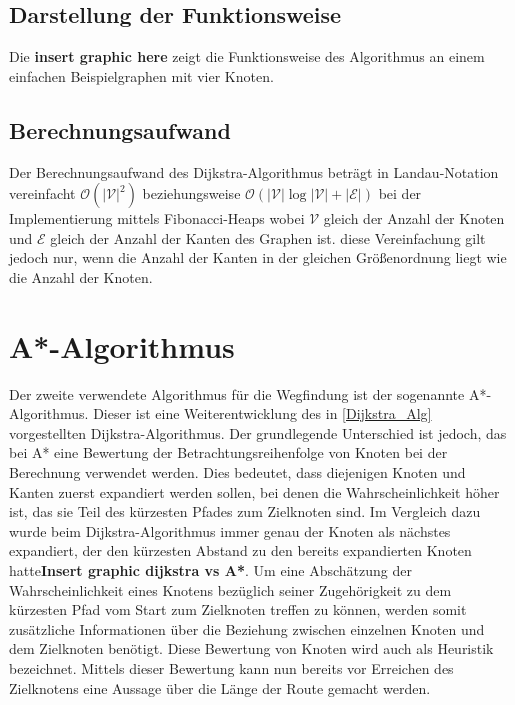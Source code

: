 	\subsection{Darstellung der Funktionsweise}
		Die \textbf{insert graphic here} zeigt die Funktionsweise des Algorithmus an einem einfachen Beispielgraphen mit vier Knoten.
	
	\subsection{Berechnungsaufwand}
		Der Berechnungsaufwand des Dijkstra-Algorithmus beträgt in Landau-Notation vereinfacht $\mathcal{O}(\lvert \mathcal{V}\rvert ^2)$ beziehungsweise $\mathcal{O}(\lvert \mathcal{V}\rvert  \log \lvert \mathcal{V}\rvert + \lvert \mathcal{E}\rvert) $ bei der Implementierung mittels Fibonacci-Heaps\cite{Fredman1984} wobei  $\mathcal{V} $ gleich der Anzahl der Knoten  und $\mathcal{E}$ gleich der Anzahl der Kanten des Graphen ist. diese Vereinfachung gilt jedoch nur, wenn die Anzahl der Kanten in der gleichen Größenordnung liegt wie die Anzahl der Knoten.
	
\section{A*-Algorithmus}
	Der zweite verwendete Algorithmus für die Wegfindung ist der sogenannte A*-Algorithmus. Dieser ist eine Weiterentwicklung des in \ref{Dijkstra_Alg} vorgestellten Dijkstra-Algorithmus. Der grundlegende Unterschied ist jedoch, das bei A* eine Bewertung der Betrachtungsreihenfolge von Knoten bei der Berechnung verwendet werden. Dies bedeutet, dass diejenigen Knoten und Kanten zuerst expandiert werden sollen, bei denen die Wahrscheinlichkeit höher ist, das sie Teil des kürzesten Pfades zum Zielknoten sind. Im Vergleich dazu wurde beim Dijkstra-Algorithmus immer genau der Knoten als nächstes expandiert, der den kürzesten Abstand zu den bereits expandierten Knoten hatte\textbf{Insert graphic dijkstra vs A*}. Um eine Abschätzung der Wahrscheinlichkeit eines Knotens bezüglich seiner Zugehörigkeit zu dem  kürzesten Pfad vom Start zum Zielknoten treffen zu können, werden somit zusätzliche Informationen über die Beziehung zwischen einzelnen Knoten und dem Zielknoten benötigt. Diese Bewertung von Knoten wird auch als Heuristik bezeichnet. Mittels dieser Bewertung kann nun bereits vor Erreichen des Zielknotens eine Aussage über die Länge der Route gemacht werden.
